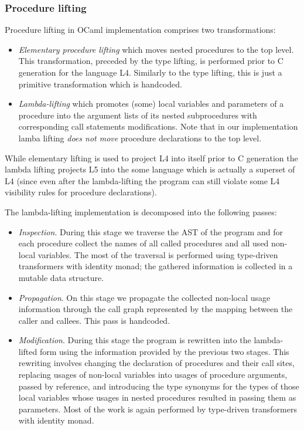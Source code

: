 \subsubsection{Procedure lifting}

Procedure lifting in OCaml implementation comprises two transformations:

\begin{itemize}
\item \emph{Elementary procedure lifting} which moves nested procedures to the top level. This transformation, 
preceded by the type lifting, is performed prior to C generation for the language L4. Similarly to the type 
lifting, this is just a primitive transformation which is handcoded.

\item \emph{Lambda-lifting} which promotes (some) local variables and parameters of a procedure into the
argument lists of its nested subprocedures with corresponding call statements modifications. Note that in
our implementation lamba lifting \emph{does not move} procedure declarations to the top level.
\end{itemize}

While elementary lifting is used to project L4 into itself prior to C generation the lambda lifting
projects L5 into the some language which is actually a superset of L4 (since even after the lambda-lifting 
the program can still violate some L4 visibility rules for procedure declarations). 

The lambda-lifting implementation is decomposed into the following passes:

\begin{itemize}
\item \emph{Inspection}. During this stage we traverse the AST of the program and for each procedure collect the 
names of all called procedures and all used non-local variables. The most of the 
traversal is performed using type-driven transformers with identity monad; the gathered information is 
collected in a mutable data structure. 

\item \emph{Propagation}. On this stage we propagate the collected non-local usage information through the call
graph represented by the mapping between the caller and callees. This pass is handcoded.

\item \emph{Modification}. During this stage the program is rewritten into the lambda-lifted form using the information
provided by the previous two stages. This rewriting involves changing the declaration of procedures and
their call sites, replacing usages of non-local variables into usages of procedure arguments, passed by 
reference, and introducing the type synonyms for the types of those local variables whose usages in 
nested procedures resulted in passing them as parameters. Most of the work is again performed by
type-driven transformers with identity monad.
\end{itemize}

